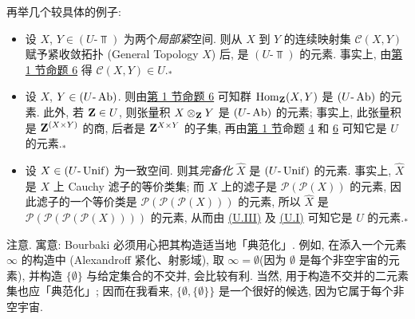 再举几个较具体的例子:
\begin{itemize}
\hypertarget{sga4.exp.I.appendix.II.sec.2.example.star.1}{}
\item[* 1)] 设 $X$, $Y\in (U\text{-}\Top)$ 为两个\emph{局部紧}空间. 则从 $X$ 到 $Y$ 的连续映射集 $\mathscr{C}(X,Y)$ 赋予紧收敛拓扑 (General Topology $X$) 后, 是 $(U\text{-}\Top)$ 的元素. 事实上, 由\hyperlink{sga4.exp.I.appendix.II.sec.1}{第 1 节}\hyperlink{sga4.exp.I.appendix.II.sec.1.proposition.6}{命题 6} 得 $\mathscr{C}(X,Y)\in U$.${}_{\mbox{*}}$

\hypertarget{sga4.exp.I.appendix.II.sec.2.example.star.2}{}
\item[* 2)] 设 $X$, $Y\in (U\text{-}\operatorname{Ab})$. 则由\hyperlink{sga4.exp.I.appendix.II.sec.1}{第 1 节}\hyperlink{sga4.exp.I.appendix.II.sec.1.proposition.6}{命题 6} 可知群 $\operatorname{Hom}_{\mathbf{Z}}(X,Y)$ 是 $(U\text{-}\operatorname{Ab})$ 的元素. 此外, 若 $\mathbf{Z}\in U$, 则张量积 $X\otimes_{\mathbf{Z}}Y$ 是 $(U\text{-}\operatorname{Ab})$ 的元素; 事实上, 此张量积是 $\mathbf{Z}^{(X\times Y)}$ 的商, 后者是 $\mathbf{Z}^{X\times Y}$ 的子集, 再由\hyperlink{sga4.exp.I.appendix.II.sec.1}{第 1 节}命题 \hyperlink{sga4.exp.I.appendix.II.sec.1.proposition.4}{4} 和 \hyperlink{sga4.exp.I.appendix.II.sec.1.proposition.6}{6} 可知它是 $U$ 的元素.${}_{\mbox{*}}$

\hypertarget{sga4.exp.I.appendix.II.sec.2.example.star.3}{}
\item[* 3)] 设 $X\in (U\text{-}\operatorname{Unif})$ 为一致空间. 则其\emph{完备化} $\widehat{X}$ 是 $(U\text{-}\operatorname{Unif})$ 的元素. 事实上, $\widehat{X}$ 是 $X$ 上 Cauchy 滤子的等价类集; 而 $X$ 上的滤子是 $\mathcal{P}(\mathcal{P}(X))$ 的元素, 因此滤子的一个等价类是 $\mathcal{P}(\mathcal{P}(\mathcal{P}(X)))$ 的元素, 所以 $\widehat{X}$ 是 $\mathcal{P}(\mathcal{P}(\mathcal{P}(\mathcal{P}(X))))$ 的元素, 从而由 \hyperlink{sga4.exp.I.appendix.II.sec.1.definition.1.condition.U.III}{(U.III)} 及 \hyperlink{sga4.exp.I.appendix.II.sec.1.definition.1.condition.U.I}{(U.I)} 可知它是 $U$ 的元素.${}_{\mbox{*}}$
\end{itemize}

注意. 寓意: Bourbaki 必须用心把其构造适当地「典范化」. 例如, 在添入一个元素 $\infty$ 的构造中 (Alexandroff 紧化、射影域), 取 $\infty =∅$\pageoriginale (因为 $∅$ 是每个非空宇宙的元素), 并构造 $\{∅\}$ 与给定集合的不交并, 会比较有利. 当然, 用于构造不交并的二元素集也应「典范化」; 因而在我看来, $\{∅, \{∅\}\}$ 是一个很好的候选, 因为它属于每个非空宇宙.




